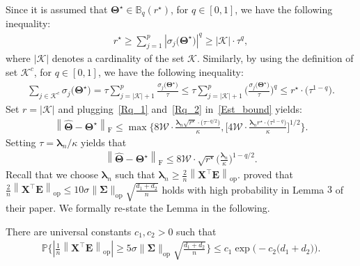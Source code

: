 \documentclass[alpha-refs]{wiley-article}
\begin{document}
Since it is assumed that $\boldsymbol{\Theta}^{\star}\in\mathbb{B}_{q}(r^{\star})$, for $q\in[0,1]$, we have the following inequality:
\begin{align} \label{Rq_1}
    r^{\star} \geq \sum_{j=1}^{p} \left| \sigma_{j}\big(\boldsymbol{\Theta}^{\star} \big) \right|^{q}
    \geq \left| \mathcal{K} \right| \cdot \tau^{q},
\end{align}
where $\left| \mathcal{K} \right|$ denotes a cardinality of the set $\mathcal{K}$.
Similarly, by using the definition of set $\mathcal{K}^{c}$, for $q\in[0,1]$, we have the following inequality:
\begin{align} \label{Rq_2}
    \sum_{j\in \mathcal{K}^{c}}\sigma_{j}\big(\boldsymbol{\Theta^{\star}}\big)
    = \tau \sum_{j = |\mathcal{K}|+1}^{p} \frac{\sigma_{j}\big(\boldsymbol{\Theta^{\star}}\big)}{\tau}
    \leq \tau \sum_{j = |\mathcal{K}|+1}^{p} \bigg(\frac{\sigma_{j}\big(\boldsymbol{\Theta^{\star}}\big)}{\tau}\bigg)^{q}
    \leq r^{\star} \cdot \big(\tau^{1-q}\big).
\end{align}
Set $r=|\mathcal{K}|$ and plugging~\eqref{Rq_1} and~\eqref{Rq_2} in~\eqref{Est_bound} yields:
\begin{align} \label{Est_bound_1}
    \left\| \widehat{\boldsymbol{\Theta}} - \boldsymbol{\Theta^{\star}} \right\|_{\text{F}}
    \leq \max\bigg\{ 8\mathcal{W} \cdot \frac{\boldsymbol{\lambda}_{n}\sqrt{r^{\star}} \cdot \big(\tau^{-q/2}\big)}{\kappa},
    \bigg[  4 \mathcal{W} \cdot \frac{\boldsymbol{\lambda}_{n}r^{\star} \cdot \big(\tau^{1-q}\big)}{\kappa}  \bigg]^{1/2}
    \bigg\}.
\end{align}
Setting $\tau=\boldsymbol{\lambda}_{n}/\kappa$ yields that
\begin{align} \label{Est_bound_2}
    \left\| \widehat{\boldsymbol{\Theta}} - \boldsymbol{\Theta^{\star}} \right\|_{\text{F}}
    \leq 8\mathcal{W} \cdot \sqrt{r^{\star}} \bigg(\frac{\boldsymbol{\lambda}_{n}}{\kappa}\bigg)^{1-q/2}.
\end{align}
Recall that we choose $\boldsymbol{\lambda}_{n}$ such that  $\boldsymbol{\lambda}_{n}\geq\frac{2}{n}\left\|\boldsymbol{X}^{\top}\boldsymbol{E} \right\|_{\text{op}}$.
\citet{negahban2011estimation} proved that $\frac{2}{n}\left\|\boldsymbol{X}^{\top}\boldsymbol{E} \right\|_{\text{op}}\leq 10 \sigma \|\boldsymbol{\Sigma}\|_{\text{op}} \sqrt{\frac{d_{1}+d_{2}}{n}} $ holds with high probability in Lemma $3$ of their paper.
We formally re-state the Lemma in the following.
\begin{lemma}
There are universal constants $c_{1},c_{2}>0$ such that
\begin{align*}
    \mathbb{P}\Bigg\{ \left|\frac{1}{n} \left\| \boldsymbol{X}^{\top}\boldsymbol{E} \right\|_{\text{op}} \right|
    \geq 5 \sigma \|\boldsymbol{\Sigma}\|_{\text{op}} \sqrt{\frac{d_{1}+d_{2}}{n}}  \Bigg\} \leq c_{1} \exp \Big( -c_{2} \big(d_{1}+d_{2}\big) \Big).
\end{align*}
\end{lemma}
\end{document}
